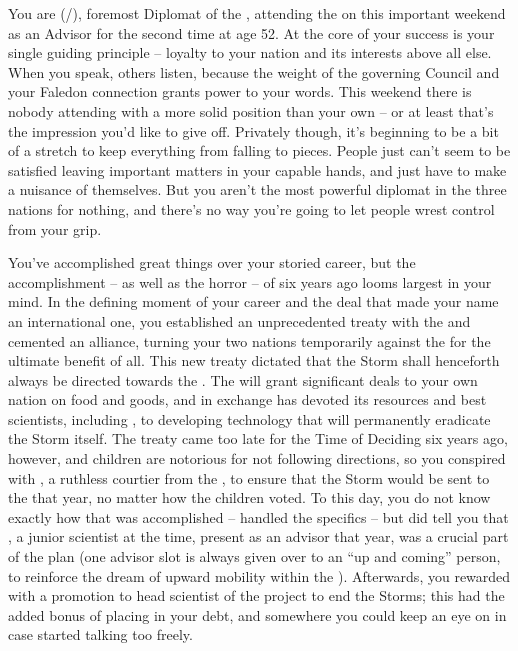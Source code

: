 \documentclass[char]{GL2020}
\begin{document}
\name{\cDiplomat{}}

You are \cDiplomat{\full} (\cDiplomat{\they}/\cDiplomat{\them}), foremost Diplomat of the \pTech{}, attending the \pSchool{} on this important weekend as an Advisor for the second time at age 52.  At the core of your success is your single guiding principle -- loyalty to your nation and its interests above all else. When you speak, others listen, because the weight of the governing Council and your Faledon connection grants power to your words. This weekend there is nobody attending with a more solid position than your own -- or at least that's the impression you'd like to give off. Privately though, it's beginning to be a bit of a stretch to keep everything from falling to pieces. People just can't seem to be satisfied leaving important matters in your capable hands, and just have to make a nuisance of themselves. But you aren't the most powerful diplomat in the three nations for nothing, and there's no way you're going to let people wrest control from your grip.

You've accomplished great things over your storied career, but the accomplishment – as well as the horror – of six years ago looms largest in your mind. In the defining moment of your career and the deal that made your name an international one, you established an unprecedented treaty with the \pFarm{} and cemented an alliance, turning your two nations temporarily against the \pShip{} for the ultimate benefit of all.  This new treaty dictated that the Storm shall henceforth always be directed towards the \pShip{}. The \pFarm{} will grant significant deals to your own nation on food and goods, and in exchange \pTech{} has devoted its resources and best scientists, including \cHeadScientist{\full}, to developing technology that will permanently eradicate the Storm itself. The treaty came too late for the Time of Deciding six years ago, however, and children are notorious for not following directions, so you conspired with \cEvil{\full}, a ruthless courtier from the \pFarm{}, to ensure that the Storm would be sent to the \pShip{} that year, no matter how the children voted. To this day, you do not know exactly how that was accomplished – \cEvil{} handled the specifics – but \cEvil{\they} did tell you that \cHeadScientist{}, a junior scientist at the time, present as an advisor that year, was a crucial part of the plan (one advisor slot is always given over to an ``up and coming'' person, to reinforce the dream of upward mobility within the \pTech{}). Afterwards, you rewarded \cHeadScientist{} with a promotion to head scientist of the project to end the Storms; this had the added bonus of placing \cHeadScientist{\them} in your debt, and somewhere you could keep an eye on \cHeadScientist{\them} in case \cHeadScientist{\they} started talking too freely.
\end{document}

